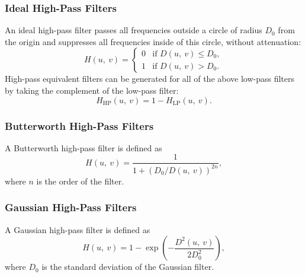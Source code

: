 \documentclass{article}
\begin{document}
\subsubsection{Ideal High-Pass Filters}
An ideal high-pass filter passes all frequencies outside a circle of
radius \(D_0\) from the origin and suppresses all frequencies inside of
this circle, without attenuation:
\begin{equation*}
    H\left( u,\: v \right) =
    \begin{cases}
        0 & \text{if } D\left( u,\: v \right) \leq D_0, \\
        1 & \text{if } D\left( u,\: v \right) > D_0.
    \end{cases}
\end{equation*}
High-pass equivalent filters can be generated for all of the above
low-pass filters by taking the complement of the low-pass filter:
\begin{equation*}
    H_{\text{HP}}\left( u,\: v \right) = 1 - H_{\text{LP}}\left( u,\: v \right).
\end{equation*}
\subsubsection{Butterworth High-Pass Filters}
A Butterworth high-pass filter is defined as
\begin{equation*}
    H\left( u,\: v \right) = \frac{1}{1 + \left( D_0/D\left( u,\: v \right) \right)^{2n}},
\end{equation*}
where \(n\) is the order of the filter.
\subsubsection{Gaussian High-Pass Filters}
A Gaussian high-pass filter is defined as
\begin{equation*}
    H\left( u,\: v \right) = 1 - \exp{\left( -\frac{D^2\left( u,\: v \right)}{2D_0^2} \right)},
\end{equation*}
where \(D_0\) is the standard deviation of the Gaussian filter.
\end{document}
